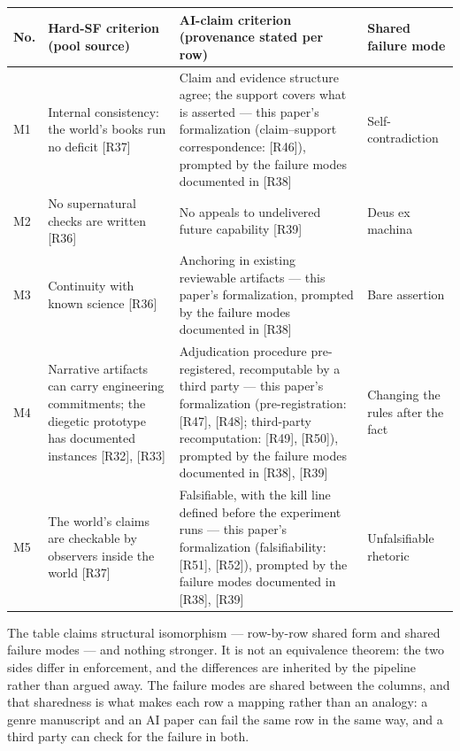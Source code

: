 \documentclass[11pt,a4paper]{article}
\begin{document}
\begin{table}[htbp]
\centering
\small
\setlength{\tabcolsep}{3.5pt}
\renewcommand{\arraystretch}{1.18}
\begin{tabularx}{0.985\textwidth}{@{}>{\raggedright\arraybackslash}p{}>{\raggedright\arraybackslash}X>{\raggedright\arraybackslash}X>{\raggedright\arraybackslash}p{}@{}}
\toprule
\textbf{No.} & \textbf{Hard-SF criterion (pool source)} & \textbf{AI-claim criterion (provenance stated per row)} & \textbf{Shared failure mode} \\
\midrule
M1 & Internal consistency: the world's books run no deficit [R37] & Claim and evidence structure agree; the support covers what is asserted — this paper's formalization (claim–support correspondence: [R46]), prompted by the failure modes documented in [R38] & Self-contradiction \\
M2 & No supernatural checks are written [R36] & No appeals to undelivered future capability [R39] & Deus ex machina \\
M3 & Continuity with known science [R36] & Anchoring in existing reviewable artifacts — this paper's formalization, prompted by the failure modes documented in [R38] & Bare assertion \\
M4 & Narrative artifacts can carry engineering commitments; the diegetic prototype has documented instances [R32], [R33] & Adjudication procedure pre-registered, recomputable by a third party — this paper's formalization (pre-registration: [R47], [R48]; third-party recomputation: [R49], [R50]), prompted by the failure modes documented in [R38], [R39] & Changing the rules after the fact \\
M5 & The world's claims are checkable by observers inside the world [R37] & Falsifiable, with the kill line defined before the experiment runs — this paper's formalization (falsifiability: [R51], [R52]), prompted by the failure modes documented in [R38], [R39] & Unfalsifiable rhetoric \\
\bottomrule
\end{tabularx}
\end{table}

The table claims structural isomorphism — row-by-row shared form and shared failure modes — and nothing stronger. It is not an equivalence theorem: the two sides differ in enforcement, and the differences are inherited by the pipeline rather than argued away. The failure modes are shared between the columns, and that sharedness is what makes each row a mapping rather than an analogy: a genre manuscript and an AI paper can fail the same row in the same way, and a third party can check for the failure in both.
\end{document}
